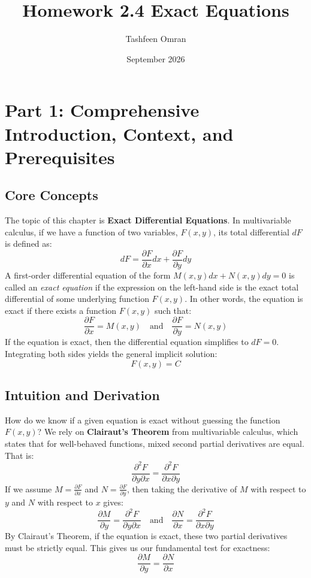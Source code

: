 \documentclass[11pt]{article}
\title{Homework 2.4 Exact Equations}
\author{Tashfeen Omran}
\date{September 2026}
\begin{document}
\maketitle
\tableofcontents
\newpage

\section{Part 1: Comprehensive Introduction, Context, and Prerequisites}

\subsection{Core Concepts}
The topic of this chapter is \textbf{Exact Differential Equations}. In multivariable calculus, if we have a function of two variables, $F(x, y)$, its total differential $dF$ is defined as:
\[ dF = \frac{\partial F}{\partial x} dx + \frac{\partial F}{\partial y} dy \]
A first-order differential equation of the form $M(x, y) dx + N(x, y) dy = 0$ is called an \textit{exact equation} if the expression on the left-hand side is the exact total differential of some underlying function $F(x, y)$. In other words, the equation is exact if there exists a function $F(x, y)$ such that:
\[ \frac{\partial F}{\partial x} = M(x, y) \quad \text{and} \quad \frac{\partial F}{\partial y} = N(x, y) \]
If the equation is exact, then the differential equation simplifies to $dF = 0$. Integrating both sides yields the general implicit solution:
\[ F(x, y) = C \]

\subsection{Intuition and Derivation}
How do we know if a given equation is exact without guessing the function $F(x, y)$? We rely on \textbf{Clairaut's Theorem} from multivariable calculus, which states that for well-behaved functions, mixed second partial derivatives are equal. That is:
\[ \frac{\partial^2 F}{\partial y \partial x} = \frac{\partial^2 F}{\partial x \partial y} \]
If we assume $M = \frac{\partial F}{\partial x}$ and $N = \frac{\partial F}{\partial y}$, then taking the derivative of $M$ with respect to $y$ and $N$ with respect to $x$ gives:
\[ \frac{\partial M}{\partial y} = \frac{\partial^2 F}{\partial y \partial x} \quad \text{and} \quad \frac{\partial N}{\partial x} = \frac{\partial^2 F}{\partial x \partial y} \]
By Clairaut's Theorem, if the equation is exact, these two partial derivatives must be strictly equal. This gives us our fundamental test for exactness:
\[ \frac{\partial M}{\partial y} = \frac{\partial N}{\partial x} \]
\end{document}
